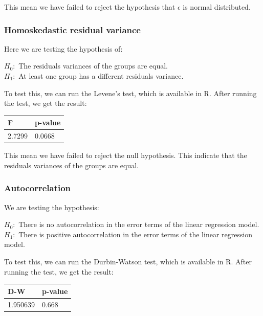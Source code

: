 This mean we have failed to reject the hypothesis that $\epsilon$ is normal distributed. 

\subsubsection{Homoskedastic residual variance}

Here we are testing the hypothesis of:

\begin{center}
    $H_0:$ The residuals variances of the groups are equal.
    \\
    $H_1:$ At least one group has a different residuals variance.
\end{center}

To test this, we can run the Levene's test, which is available in R. After running the test, we get the result:

\begin{table}[H]
\centering
{}
\begin{tabular}{ll}
  \hline
                F             & p-value    \\
    \hline
        2.7299 &  0.0668   \\

   \hline
\end{tabular}
\label{tab:vif}
\end{table}

This mean we have failed to reject the null hypothesis. This indicate that the residuals variances of the groups are equal.

\subsubsection{Autocorrelation}

We are testing the hypothesis:

\begin{center}
    $H_0:$ There is no autocorrelation in the error terms of the linear regression model.
    \\
    $H_1:$ There is positive autocorrelation in the error terms of the linear regression model.
\end{center}

To test this, we can run the Durbin-Watson test, which is available in R. After running the test, we get the result:

\begin{table}[H]
\centering
{}
\begin{tabular}{ll}
  \hline
                D-W             & p-value    \\
    \hline
        1.950639  & 0.668   \\

   \hline
\end{tabular}
\label{tab:vif}
\end{table}

